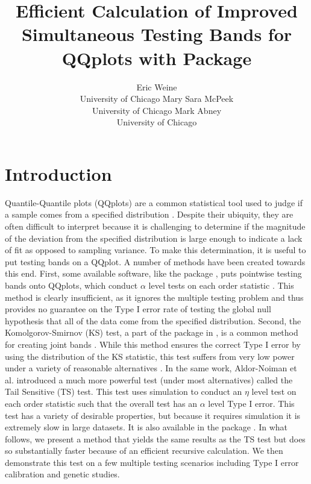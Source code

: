 \documentclass[article]{jss}
\author{Eric Weine\\University of Chicago
   \And Mary Sara McPeek\\University of Chicago
   \And Mark Abney\\University of Chicago}
\title{Efficient Calculation of Improved Simultaneous Testing Bands for QQplots with \proglang{R} Package \pkg{qqconf}}
\begin{document}
\maketitle

\section{Introduction}
Quantile-Quantile plots (QQplots) are a common statistical tool used to judge if a sample comes from a specified distribution \citep{wilk_gnanadesikan_1968}. Despite their ubiquity, they are often difficult to interpret because it is challenging to determine if the magnitude of the deviation from the specified distribution is large enough to indicate a lack of fit as opposed to sampling variance. To make this determination, it is useful to put testing bands on a QQplot.
\newline
\newline
A number of methods have been created towards this end. First, some available software, like the  package , puts pointwise testing bands onto QQplots, which conduct $\alpha$ level tests on each order statistic \citep{qqplotr}. This method is clearly insufficient, as it ignores the multiple testing problem and thus provides no guarantee on the Type I error rate of testing the global null hypothesis that all of the data come from the specified distribution. Second, the Komolgorov-Smirnov (KS) test, a part of the  package in , is a common method for creating joint bands \citep{kolmogoroff1941confidence, smirnov1944approximate}. While this method ensures the correct Type I error by using the distribution of the KS statistic, this test suffers from very low power under a variety of reasonable alternatives \citep{aldor2013power}. In the same work, Aldor-Noiman et al. introduced a much more powerful test (under most alternatives) called the Tail Sensitive (TS) test. This test uses simulation to conduct an $\eta$ level test on each order statistic such that the overall test has an $\alpha$ level Type I error. This test has a variety of desirable properties, but because it requires simulation it is extremely slow in large datasets. It is also available in the package .
\newline
\newline
In what follows, we present a method that yields the same results as the TS test but does so substantially faster because of an efficient recursive calculation. We then demonstrate this test on a few multiple testing scenarios including Type I error calibration and genetic studies.
\end{document}
